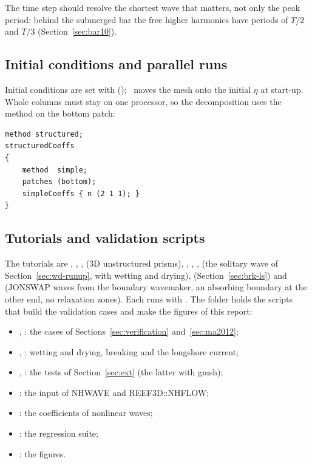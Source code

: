 The time step should resolve the shortest wave that matters, not only the
peak period: behind the submerged bar the free higher harmonics have periods
of $T/2$ and $T/3$ (Section~\ref{sec:bar10}).

\subsection{Initial conditions and parallel runs}

Initial conditions are set with 
(); \NHFOAM\ moves the mesh onto the initial
$\eta$ at start-up. Whole columns must stay on one processor, so the
decomposition uses the  method on the bottom patch:
\begin{verbatim}
method structured;
structuredCoeffs
{
    method  simple;
    patches (bottom);
    simpleCoeffs { n (2 1 1); }
}
\end{verbatim}

\subsection{Tutorials and validation scripts}

The tutorials are , ,
,  (3D unstructured prisms),
, , ,
 (the solitary wave of Section~\ref{sec:wd-runup}, with
wetting and drying),  (Section~\ref{sec:brk-ls}) and
 (JONSWAP waves from the boundary wavemaker, an absorbing
boundary at the other end, no relaxation zones). Each runs with
. The folder  holds the scripts that build
the validation cases and make the figures of this report:
\begin{itemize}[nosep]
  \item {}, : the cases of
        Sections~\ref{sec:verification} and~\ref{sec:ma2012};
  \item {}, : wetting and drying, breaking
        and the longshore current;
  \item {}, : the tests of
        Section~\ref{sec:ext} (the latter with gmsh);
  \item {}: the input of NHWAVE and REEF3D::NHFLOW;
  \item {}: the coefficients of nonlinear waves;
  \item {}: the regression suite;
  \item {}: the figures.
\end{itemize}
